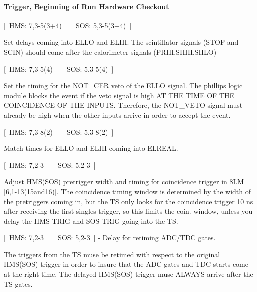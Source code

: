 \paragraph{Trigger, Beginning of Run Hardware Checkout}

\begin{description}
\item{[~HMS: 7,3-5(3+4)~~~~SOS: 5,3-5(3+4)~]}
\end{description}

Set delays coming into ELLO and ELHI. The scintillator signals (STOF
and SCIN) should come after the calorimeter signals (PRHI,SHHI,SHLO)	

\begin{description}
\item{[~HMS: 7,3-5(4)~~~~SOS: 5,3-5(4)~]}
\end{description}

Set the timing for the NOT\_CER veto of the ELLO signal. The phillips
logic module blocks the event if the veto signal is high AT THE TIME OF THE
COINCIDENCE OF THE INPUTS. Therefore, the NOT\_VETO signal must already be 
high
when the other inputs arrive in order to accept the event.

\begin{description}
\item{[~HMS: 7,3-8(2)~~~~SOS: 5,3-8(2)~]}
\end{description}

Match times for ELLO and ELHI coming into ELREAL.

\begin{description}
\item{[~HMS: 7,2-3~~~~SOS: 5,2-3~]}
\end{description}

Adjust HMS(SOS) pretrigger width and timing for coincidence trigger
in 8LM [6,1-13(15and16)]. The coincidence timing window is determined by
the width of the pretriggers coming in, but the TS only looks for the
coincidence trigger 10 ns after receiving the first singles trigger,
so this limits the coin. window, unless you delay the HMS TRIG and SOS TRIG
going into the TS.

\begin{description}
\item{[~HMS: 7,2-3~~~~SOS: 5,2-3~] - Delay for retiming ADC/TDC gates.}
\end{description}

The triggers from the TS muse be retimed with respect to the original
HMS(SOS) trigger in order to insure that the ADC gates and TDC starts come at
the right time. The delayed HMS(SOS) trigger muse ALWAYS arrive after the TS
gates.

